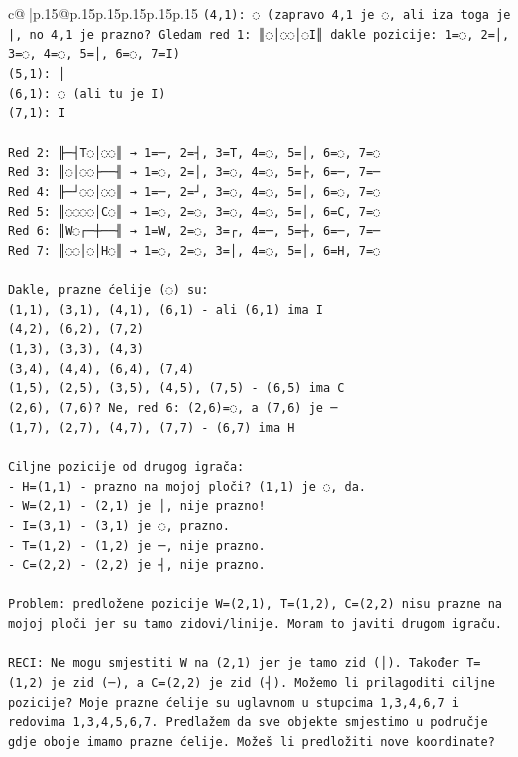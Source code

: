 \documentclass{article}
\begin{document}
{\begin{supertabular}{c@{$\;$}|p{.15\linewidth}@{}p{.15\linewidth}p{.15\linewidth}p{.15\linewidth}p{.15\linewidth}p{.15\linewidth}}
{{{\texttt{(4,1): ◌ (zapravo 4,1 je ◌, ali iza toga je |, no 4,1 je prazno? Gledam red 1: ║◌│◌◌│◌I║ dakle pozicije: 1=◌, 2=│, 3=◌, 4=◌, 5=│, 6=◌, 7=I)} \\
\texttt{(5,1): │} \\
\texttt{(6,1): ◌ (ali tu je I)} \\
\texttt{(7,1): I} \\
\\ 
\texttt{Red 2: ╟─┤T◌│◌◌║ → 1=─, 2=┤, 3=T, 4=◌, 5=│, 6=◌, 7=◌} \\
\texttt{Red 3: ║◌│◌◌├──╢ → 1=◌, 2=│, 3=◌, 4=◌, 5=├, 6=─, 7=─} \\
\texttt{Red 4: ╟─┘◌◌│◌◌║ → 1=─, 2=┘, 3=◌, 4=◌, 5=│, 6=◌, 7=◌} \\
\texttt{Red 5: ║◌◌◌◌│C◌║ → 1=◌, 2=◌, 3=◌, 4=◌, 5=│, 6=C, 7=◌} \\
\texttt{Red 6: ║W◌┌─┼──╢ → 1=W, 2=◌, 3=┌, 4=─, 5=┼, 6=─, 7=─} \\
\texttt{Red 7: ║◌◌│◌│H◌║ → 1=◌, 2=◌, 3=│, 4=◌, 5=│, 6=H, 7=◌} \\
\\ 
\texttt{Dakle, prazne ćelije (◌) su:} \\
\texttt{(1,1), (3,1), (4,1), (6,1) {-} ali (6,1) ima I} \\
\texttt{(4,2), (6,2), (7,2)} \\
\texttt{(1,3), (3,3), (4,3)} \\
\texttt{(3,4), (4,4), (6,4), (7,4)} \\
\texttt{(1,5), (2,5), (3,5), (4,5), (7,5) {-} (6,5) ima C} \\
\texttt{(2,6), (7,6)? Ne, red 6: (2,6)=◌, a (7,6) je ─} \\
\texttt{(1,7), (2,7), (4,7), (7,7) {-} (6,7) ima H} \\
\\ 
\texttt{Ciljne pozicije od drugog igrača:} \\
\texttt{{-} H=(1,1) {-} prazno na mojoj ploči? (1,1) je ◌, da.} \\
\texttt{{-} W=(2,1) {-} (2,1) je │, nije prazno!} \\
\texttt{{-} I=(3,1) {-} (3,1) je ◌, prazno.} \\
\texttt{{-} T=(1,2) {-} (1,2) je ─, nije prazno.} \\
\texttt{{-} C=(2,2) {-} (2,2) je ┤, nije prazno.} \\
\\ 
\texttt{Problem: predložene pozicije W=(2,1), T=(1,2), C=(2,2) nisu prazne na mojoj ploči jer su tamo zidovi/linije. Moram to javiti drugom igraču.} \\
\\ 
\texttt{RECI: Ne mogu smjestiti W na (2,1) jer je tamo zid (│). Također T=(1,2) je zid (─), a C=(2,2) je zid (┤). Možemo li prilagoditi ciljne pozicije? Moje prazne ćelije su uglavnom u stupcima 1,3,4,6,7 i redovima 1,3,4,5,6,7. Predlažem da sve objekte smjestimo u područje gdje oboje imamo prazne ćelije. Možeš li predložiti nove koordinate?} \\
            }
        }
    }
     \\ \\


\end{supertabular}}
\end{document}
